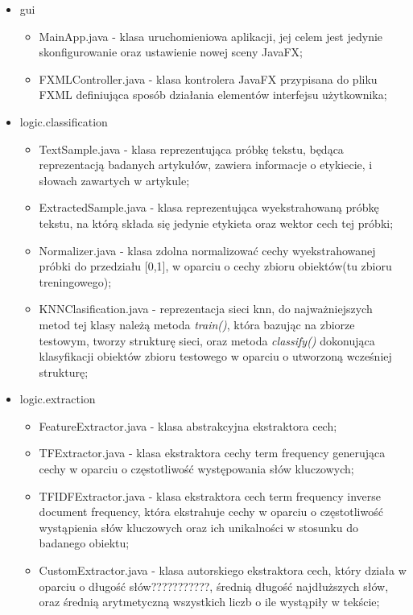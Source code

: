 \documentclass{classrep}
\begin{document}
\begin{itemize}
	\item gui
	\begin{itemize}
		\item MainApp.java - klasa uruchomieniowa aplikacji, jej celem jest jedynie skonfigurowanie oraz ustawienie nowej sceny JavaFX;
		\item FXMLController.java - klasa kontrolera JavaFX przypisana do pliku FXML definiująca sposób działania elementów interfejsu użytkownika;
	\end{itemize}
	\item logic.classification
	\begin{itemize}
		\item TextSample.java - klasa reprezentująca próbkę tekstu, będąca reprezentacją badanych artykułów, zawiera informacje o etykiecie, i słowach zawartych w artykule;
		\item ExtractedSample.java - klasa reprezentująca wyekstrahowaną próbkę tekstu, na którą składa się jedynie etykieta oraz wektor cech tej próbki;
		\item Normalizer.java - klasa zdolna normalizować cechy wyekstrahowanej próbki do przedziału [0,1], w oparciu o cechy zbioru obiektów(tu zbioru treningowego);
		\item KNNClasification.java - reprezentacja sieci knn, do najważniejszych metod tej klasy należą metoda \textit{train()}, która bazując na zbiorze testowym, tworzy strukturę sieci, oraz metoda \textit{classify()} dokonująca klasyfikacji obiektów zbioru testowego w oparciu o utworzoną wcześniej strukturę;
	\end{itemize}
	\item logic.extraction
	\begin{itemize}
		\item FeatureExtractor.java - klasa abstrakcyjna ekstraktora cech;
		\item TFExtractor.java - klasa ekstraktora cechy term frequency generująca cechy w oparciu o częstotliwość występowania słów kluczowych;
		\item TFIDFExtractor.java - klasa ekstraktora cech term frequency inverse document frequency, która ekstrahuje cechy w oparciu o częstotliwość wystąpienia słów kluczowych oraz ich unikalności w stosunku do badanego obiektu;
		\item CustomExtractor.java - klasa autorskiego ekstraktora cech, który działa w oparciu o długość słów???????????, średnią długość najdłuższych słów, oraz średnią arytmetyczną wszystkich liczb o ile wystąpiły w tekście;

\end{itemize}
\end{itemize}
\end{document}
